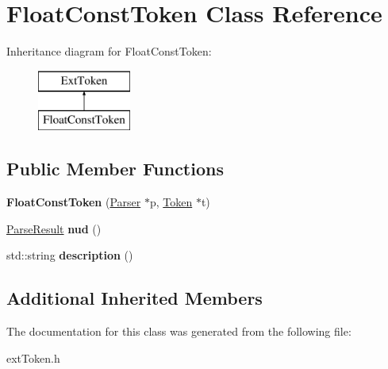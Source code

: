 \hypertarget{class_float_const_token}{}\section{Float\+Const\+Token Class Reference}
\label{class_float_const_token}
Inheritance diagram for Float\+Const\+Token\+:\begin{figure}[H]
\begin{center}
\leavevmode
\includegraphics[height=2.000000cm]{class_float_const_token}
\end{center}
\end{figure}
\subsection*{Public Member Functions}
\begin{DoxyCompactItemize}
\item 
\hypertarget{class_float_const_token_aecee1d0e4e8a9410701c68c30858a4db}{}{\bfseries Float\+Const\+Token} (\hyperlink{class_parser}{Parser} $\ast$p, \hyperlink{class_token}{Token} $\ast$t)\label{class_float_const_token_aecee1d0e4e8a9410701c68c30858a4db}

\item 
\hypertarget{class_float_const_token_a991e92ae34d0b01a3b1dd08ed01b8e6e}{}\hyperlink{class_parse_result}{Parse\+Result} {\bfseries nud} ()\label{class_float_const_token_a991e92ae34d0b01a3b1dd08ed01b8e6e}

\item 
\hypertarget{class_float_const_token_a529b6d3ad479b0f6b940a82ba48b98c0}{}std\+::string {\bfseries description} ()\label{class_float_const_token_a529b6d3ad479b0f6b940a82ba48b98c0}

\end{DoxyCompactItemize}
\subsection*{Additional Inherited Members}


The documentation for this class was generated from the following file\+:\begin{DoxyCompactItemize}
\item 
ext\+Token.\+h\end{DoxyCompactItemize}
